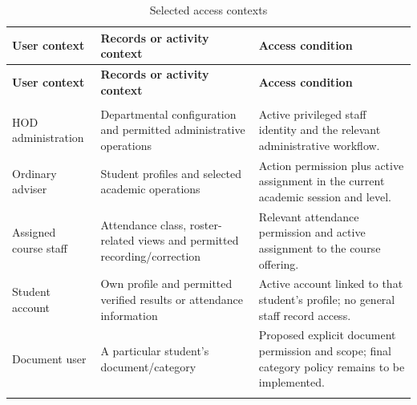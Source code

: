 \begingroup
\singlespacing%
\setlength{\tabcolsep}{4pt}
\begin{longtable}{@{}>{\RaggedRight\arraybackslash}p{}>{\RaggedRight\arraybackslash}p{}>{\RaggedRight\arraybackslash}p{}@{}}
\caption{Selected access contexts}\label{tab:3-5}\\
\toprule
\textbf{User context} & \textbf{Records or activity context} & \textbf{Access condition} \\
\midrule
\endfirsthead%
\toprule
\textbf{User context} & \textbf{Records or activity context} & \textbf{Access condition} \\
\midrule
\endhead%
\midrule
\multicolumn{3}{r}{Continued on next page}\\
\endfoot%
\bottomrule
\endlastfoot%
HOD administration & Departmental configuration and permitted administrative operations & Active privileged staff identity and the relevant administrative workflow. \\ \addlinespace
Ordinary adviser & Student profiles and selected academic operations & Action permission plus active assignment in the current academic session and level. \\ \addlinespace
Assigned course staff & Attendance class, roster-related views and permitted recording/correction & Relevant attendance permission and active assignment to the course offering. \\ \addlinespace
Student account & Own profile and permitted verified results or attendance information & Active account linked to that student's profile; no general staff record access. \\ \addlinespace
Document user & A particular student's document/category & Proposed explicit document permission and scope; final category policy remains to be implemented. \\ \addlinespace
\end{longtable}
\endgroup

